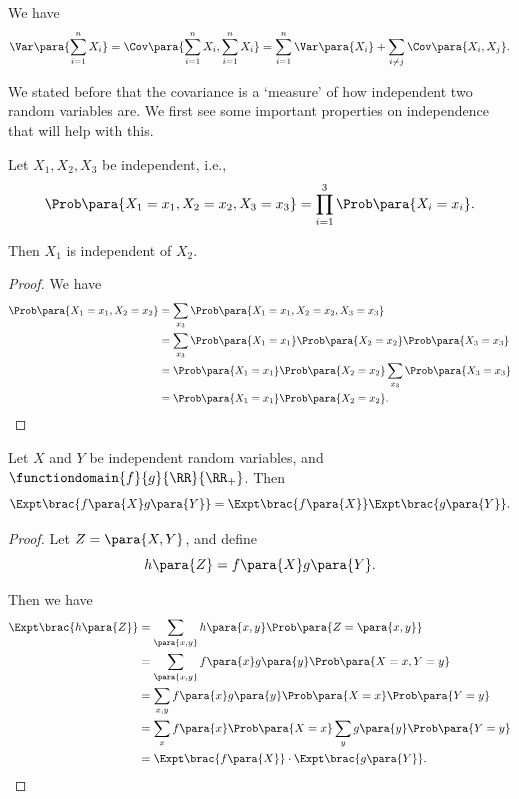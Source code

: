 \begin{corollary}
    \label{cor:variance-of-sum}%
    We have
    \[
        \Var\para{\sum_{i = 1}^{n} X_i} = \Cov\para{\sum_{i = 1}^{n} X_i, \sum_{i = 1}^{n} X_i} = \sum_{i = 1}^{n} \Var\para{X_i} + \sum_{i \neq j} \Cov\para{X_i, X_j}.
    \]
\end{corollary}

We stated before that the covariance is a `measure' of how independent two random variables are. We first see some important properties on independence that will help with this.

\begin{lemma}
    \label{lem:indep-pairwise-indep}%
    Let \(X_1, X_2, X_3\) be independent, i.e.,
    \[
        \Prob\para{X_1 = x_1, X_2 = x_2, X_3 = x_3} = \prod_{i = 1}^{3} \Prob\para{X_i = x_i}.
    \]

    Then \(X_1\) is independent of \(X_2\).
\end{lemma}

\begin{proof}
    We have
    \begin{align*}
        \Prob\para{X_1 = x_1, X_2 = x_2} &= \sum_{x_3} \Prob\para{X_1 = x_1, X_2 = x_2, X_3 = x_3} \\
        &= \sum_{x_3} \Prob\para{X_1 = x_1} \Prob\para{X_2 = x_2} \Prob\para{X_3 = x_3} \\
        &= \Prob\para{X_1 = x_1} \Prob\para{X_2 = x_2} \sum_{x_3} \Prob\para{X_3 = x_3} \\
        &= \Prob\para{X_1 = x_1} \Prob\para{X_2 = x_2}.
    \end{align*}
\end{proof}

\begin{lemma}
    \label{lem:independence-expectation-product}%
    Let \(X\) and \(Y\) be independent random variables, and \(\functiondomain{f}{g}{\RR}{\RR_{+}}\). Then
    \[
        \Expt\brac{f\para{X} g\para{Y}} = \Expt\brac{f\para{X}} \Expt\brac{g\para{Y}}.
    \]
\end{lemma}

\begin{proof}
    Let \(Z = \para{X, Y}\), and define
    \[  
        h\para{Z} = f\para{X} g\para{Y}.
    \]

    Then we have
    \begin{align*}
        \Expt\brac{h\para{Z}} &= \sum_{\para{x, y}} h\para{x, y} \Prob\para{Z = \para{x, y}} \\
        &= \sum_{\para{x, y}} f\para{x} g\para{y} \Prob\para{X = x, Y = y} \\
        &= \sum_{x, y} f\para{x} g\para{y} \Prob\para{X = x} \Prob\para{Y = y} \\
        &= \sum_{x} f\para{x} \Prob\para{X = x} \sum_{y} g\para{y} \Prob\para{Y = y} \\
        &= \Expt\brac{f\para{X}} \cdot \Expt\brac{g\para{Y}}.
    \end{align*}
\end{proof}

